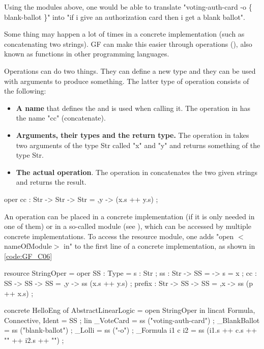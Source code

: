 Using the modules above, one would be able to translate "voting-auth-card -o \{ blank-ballot \}" into "if i give an authorization card then i get a blank ballot".

Some thing may happen a lot of times in a concrete implementation (such as concatenating two strings). GF can make this easier through operations (), also known as functions in other programming languages. 

Operations can do two things. They can define a new type and they can be used with arguments to produce something. The latter type of operation consists of the following:
\begin{itemize}
\item \textbf{A name} that defines the  and is used when calling it. The operation in  has the name "cc" (concatenate).

\item \textbf{Arguments, their types and the return type.} The operation in  takes two arguments of the type Str called "x" and "y" and returns something of the type Str.

\item \textbf{The actual operation}. The operation in  concatenates the two given strings and returns the result.
\end{itemize}

\begin{lstgf}
oper 
    cc : Str -> Str -> Str = \x,y -> (x.s ++ y.s) ;
\end{lstgf}

An operation can be placed in a concrete implementation (if it is only needed in one of them) or in a so-called  module (see ), which can be accessed by multiple concrete implementations. To access the resource module, one adds "open $<$nameOfModule$>$ in" to the first line of a concrete implementation, as shown in \ref{code:GF_C06}

\begin{lstgf}
resource StringOper = {
    oper
        SS : Type = {s : Str} ;
        ss : Str -> SS = \x -> {s = x} ;
        cc : SS -> SS -> SS = \x,y -> ss (x.s ++ y.s) ;
        prefix : Str -> SS -> SS = \p,x -> ss (p ++ x.s) ;
}
\end{lstgf}

\begin{lstgf}
concrete HelloEng of AbstractLinearLogic = open StringOper in {
    lincat 
        Formula, Connective, Ident = SS ;
    lin 
        _VoteCard = ss ("voting-auth-card") ;
        _BlankBallot = ss ("blank-ballot") ;
        _Lolli = ss ("-o") ;
        _Formula i1 c i2 = ss (i1.s ++ c.s ++ "{" ++ i2.s ++ "}") ;
}
\end{lstgf}


